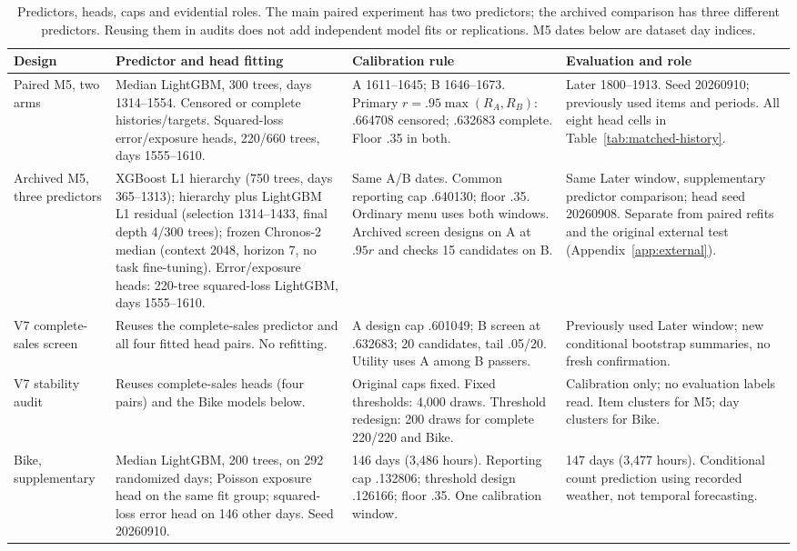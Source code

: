 \begin{table}[H]\centering\scriptsize\setlength{\tabcolsep}{4pt}
\caption{Predictors, heads, caps and evidential roles. The main paired experiment has two predictors; the archived comparison has three different predictors. Reusing them in audits does not add independent model fits or replications. M5 dates below are dataset day indices.}\label{tab:experiment-map}
\begin{tabular}{p{.16\linewidth}p{.27\linewidth}p{.22\linewidth}p{.26\linewidth}}\toprule
Design & Predictor and head fitting & Calibration rule & Evaluation and role\\\midrule
Paired M5, two arms & Median LightGBM, 300 trees, days 1314--1554. Censored or complete histories/targets. Squared-loss error/exposure heads, 220/660 trees, days 1555--1610. & A 1611--1645; B 1646--1673. Primary $r=.95\max(R_A,R_B)$: .664708 censored; .632683 complete. Floor .35 in both. & Later 1800--1913. Seed 20260910; previously used items and periods. All eight head cells in Table~\ref{tab:matched-history}.\\
Archived M5, three predictors & XGBoost L1 hierarchy (750 trees, days 365--1313); hierarchy plus LightGBM L1 residual (selection 1314--1433, final depth 4/300 trees); frozen Chronos-2 median (context 2048, horizon 7, no task fine-tuning). Error/exposure heads: 220-tree squared-loss LightGBM, days 1555--1610. & Same A/B dates. Common reporting cap .640130; floor .35. Ordinary menu uses both windows. Archived screen designs on A at $.95r$ and checks 15 candidates on B. & Same Later window, supplementary predictor comparison; head seed 20260908. Separate from paired refits and the original external test (Appendix~\ref{app:external}).\\
V7 complete-sales screen & Reuses the complete-sales predictor and all four fitted head pairs. No refitting. & A design cap .601049; B screen at .632683; 20 candidates, tail .05/20. Utility uses A among B passers. & Previously used Later window; new conditional bootstrap summaries, no fresh confirmation.\\
V7 stability audit & Reuses complete-sales heads (four pairs) and the Bike models below. & Original caps fixed. Fixed thresholds: 4,000 draws. Threshold redesign: 200 draws for complete 220/220 and Bike. & Calibration only; no evaluation labels read. Item clusters for M5; day clusters for Bike.\\
Bike, supplementary & Median LightGBM, 200 trees, on 292 randomized days; Poisson exposure head on the same fit group; squared-loss error head on 146 other days. Seed 20260910. & 146 days (3,486 hours). Reporting cap .132806; threshold design .126166; floor .35. One calibration window. & 147 days (3,477 hours). Conditional count prediction using recorded weather, not temporal forecasting.\\\bottomrule
\end{tabular}\end{table}

